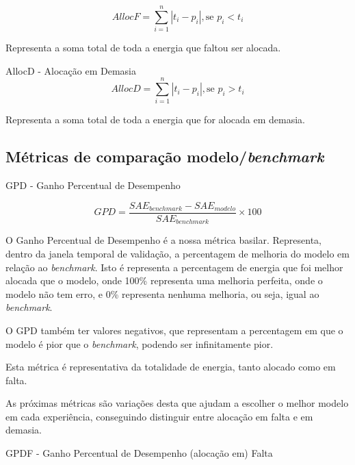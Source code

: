 \begin{equation} \label{eq:allocf} 
    AllocF = \sum_{i=1}^{n}\left|t_i - p_i \right| , \text{se } p_i < t_i
\end{equation}
\smallskip

Representa a soma total de toda a energia que faltou ser alocada.\par
\bigskip
AllocD - Alocação em Demasia \\


\begin{equation} \label{eq:allocd} 
    AllocD = \sum_{i=1}^{n}\left|t_i - p_i \right| , \text{se } p_i > t_i
\end{equation}
\smallskip

Representa a soma total de toda a energia que for alocada em demasia.\par

\subsection{Métricas de comparação modelo/\textit{benchmark}}

GPD - Ganho Percentual de Desempenho

\begin{equation} \label{eq:gpd} 
    GPD = \frac{SAE_{benchmark} - SAE_{modelo}}{SAE_{benchmark}} \times 100
\end{equation}
\smallskip

O Ganho Percentual de Desempenho é a nossa métrica basilar. Representa, dentro da janela temporal de validação, a percentagem de melhoria do modelo em relação ao \textit{benchmark}. Isto é representa a percentagem de energia que foi melhor alocada que o modelo, onde 100\% representa uma melhoria perfeita, onde o modelo não tem erro, e 0\% representa nenhuma melhoria, ou seja, igual ao \textit{benchmark}. \par
O GPD também ter valores negativos, que representam a percentagem em que o modelo é pior que o \textit{benchmark}, podendo ser infinitamente pior.\par
Esta métrica é representativa da totalidade de energia, tanto alocado como em falta.\par
As próximas métricas são variações desta que ajudam a escolher o melhor modelo em cada experiência, conseguindo distinguir entre alocação em falta e em demasia.\par
\bigskip
GPDF - Ganho Percentual de Desempenho (alocação em) Falta\\


